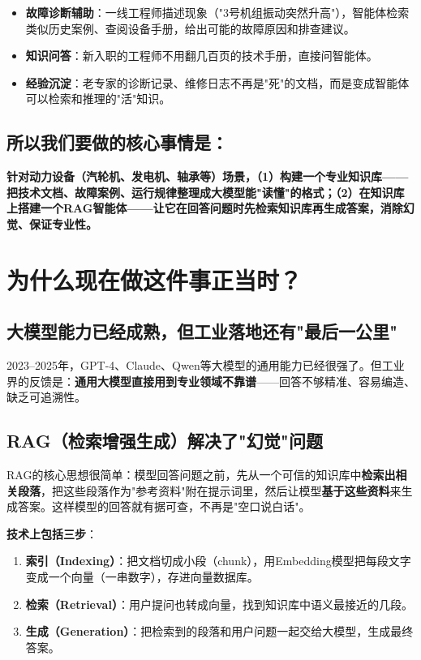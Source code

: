 \documentclass[a4paper, 11pt]{ctexart}
\begin{document}
\begin{itemize}
    \item \textbf{故障诊断辅助}：一线工程师描述现象（"3号机组振动突然升高"），智能体检索类似历史案例、查阅设备手册，给出可能的故障原因和排查建议。
    \item \textbf{知识问答}：新入职的工程师不用翻几百页的技术手册，直接问智能体。
    \item \textbf{经验沉淀}：老专家的诊断记录、维修日志不再是"死"的文档，而是变成智能体可以检索和推理的"活"知识。
\end{itemize}

\subsection{所以我们要做的核心事情是：}

\begin{tcolorbox}[colback=bglight, colframe=tsinghua!30, arc=2mm]
\textbf{针对动力设备（汽轮机、发电机、轴承等）场景，（1）构建一个专业知识库——把技术文档、故障案例、运行规律整理成大模型能"读懂"的格式；（2）在知识库上搭建一个RAG智能体——让它在回答问题时先检索知识库再生成答案，消除幻觉、保证专业性。}
\end{tcolorbox}


\section{为什么现在做这件事正当时？}

\subsection{大模型能力已经成熟，但工业落地还有"最后一公里"}

2023--2025年，GPT-4、Claude、Qwen等大模型的通用能力已经很强了。但工业界的反馈是：\textbf{通用大模型直接用到专业领域不靠谱}——回答不够精准、容易编造、缺乏可追溯性。

\subsection{RAG（检索增强生成）解决了"幻觉"问题}

RAG的核心思想很简单：模型回答问题之前，先从一个可信的知识库中\textbf{检索出相关段落}，把这些段落作为"参考资料"附在提示词里，然后让模型\textbf{基于这些资料}来生成答案。这样模型的回答就有据可查，不再是"空口说白话"。

\textbf{技术上包括三步}：
\begin{enumerate}
    \item \textbf{索引（Indexing）}：把文档切成小段（chunk），用Embedding模型把每段文字变成一个向量（一串数字），存进向量数据库。
    \item \textbf{检索（Retrieval）}：用户提问也转成向量，找到知识库中语义最接近的几段。
    \item \textbf{生成（Generation）}：把检索到的段落和用户问题一起交给大模型，生成最终答案。
\end{enumerate}
\end{document}
